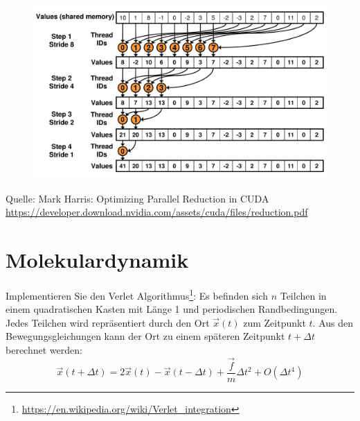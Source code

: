 \documentclass[headsepline=3pt,headinclude=true,12pt,oneside]{scrartcl}
\begin{document}
		\begin{figure}[h]
			\centering
			\includegraphics[scale=0.4]{3.png}		
		\end{figure}
		
		Quelle: Mark Harris: Optimizing Parallel Reduction in CUDA\\ 
		\url{https://developer.download.nvidia.com/assets/cuda/files/reduction.pdf}
		
	\section{Molekulardynamik}
	Implementieren Sie den Verlet Algorithmus\footnote{\url{https://en.wikipedia.org/wiki/Verlet_integration}}: Es befinden sich $n$ Teilchen in einem quadratischen Kasten mit Länge 1 und periodischen Randbedingungen. Jedes Teilchen wird repräsentiert durch den Ort $\vec{x}(t)$ zum Zeitpunkt $t$.
	Aus den Bewegungsgleichungen kann der Ort zu einem späteren Zeitpunkt $t+\Delta t$ berechnet werden:
	\begin{equation}
		\vec{x}(t+\Delta t) = 2\vec{x}(t) - \vec{x}(t-\Delta t) + \frac{\vec{f}}{m}\Delta t^2 + O(\Delta t^4)
	\end{equation}
	
\end{document}
